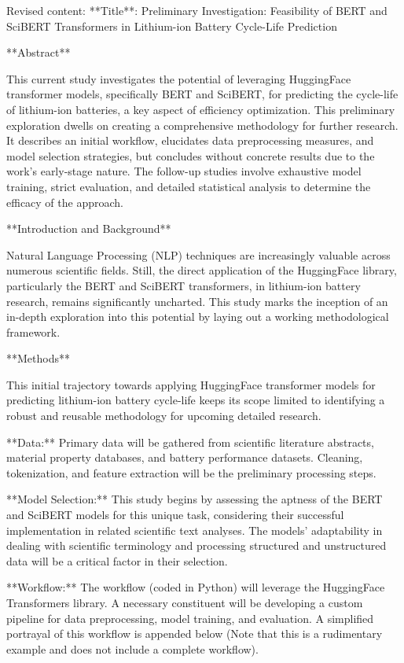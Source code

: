 Revised content:
**Title**: Preliminary Investigation: Feasibility of BERT and SciBERT Transformers in Lithium-ion Battery Cycle-Life Prediction

**Abstract**

This current study investigates the potential of leveraging HuggingFace transformer models, specifically BERT and SciBERT, for predicting the cycle-life of lithium-ion batteries, a key aspect of efficiency optimization. This preliminary exploration dwells on creating a comprehensive methodology for further research. It describes an initial workflow, elucidates data preprocessing measures, and model selection strategies, but concludes without concrete results due to the work's early-stage nature. The follow-up studies involve exhaustive model training, strict evaluation, and detailed statistical analysis to determine the efficacy of the approach.

**Introduction and Background**

Natural Language Processing (NLP) techniques are increasingly valuable across numerous scientific fields. Still, the direct application of the HuggingFace library, particularly the BERT and SciBERT transformers, in lithium-ion battery research, remains significantly uncharted. This study marks the inception of an in-depth exploration into this potential by laying out a working methodological framework. 

**Methods**

This initial trajectory towards applying HuggingFace transformer models for predicting lithium-ion battery cycle-life keeps its scope limited to identifying a robust and reusable methodology for upcoming detailed research.

**Data:** Primary data will be gathered from scientific literature abstracts, material property databases, and battery performance datasets. Cleaning, tokenization, and feature extraction will be the preliminary processing steps. 

**Model Selection:** This study begins by assessing the aptness of the BERT and SciBERT models for this unique task, considering their successful implementation in related scientific text analyses. The models' adaptability in dealing with scientific terminology and processing structured and unstructured data will be a critical factor in their selection.

**Workflow:** The workflow (coded in Python) will leverage the HuggingFace Transformers library. A necessary constituent will be developing a custom pipeline for data preprocessing, model training, and evaluation. A simplified portrayal of this workflow is appended below (Note that this is a rudimentary example and does not include a complete workflow). 

